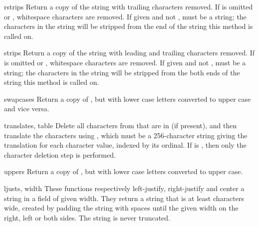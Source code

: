\begin{funcdesc}{rstrip}{s}
Return a copy of the string with trailing characters removed.  If
 is omitted or , whitespace characters are
removed.  If given and not ,  must be a string;
the characters in the string will be stripped from the end of the
string this method is called on.
\end{funcdesc}

\begin{funcdesc}{strip}{s}
Return a copy of the string with leading and trailing characters
removed.  If  is omitted or , whitespace
characters are removed.  If given and not , 
must be a string; the characters in the string will be stripped from
the both ends of the string this method is called on.
\end{funcdesc}

\begin{funcdesc}{swapcase}{s}
  Return a copy of , but with lower case letters
  converted to upper case and vice versa.
\end{funcdesc}

\begin{funcdesc}{translate}{s, table}
  Delete all characters from  that are in  (if 
  present), and then translate the characters using , which 
  must be a 256-character string giving the translation for each
  character value, indexed by its ordinal.  If  is ,
  then only the character deletion step is performed.
\end{funcdesc}

\begin{funcdesc}{upper}{s}
  Return a copy of , but with lower case letters converted to
  upper case.
\end{funcdesc}

\begin{funcdesc}{ljust}{s, width}
  These functions respectively left-justify, right-justify and center
  a string in a field of given width.  They return a string that is at
  least  characters wide, created by padding the string
   with spaces until the given width on the right, left or both
  sides.  The string is never truncated.
\end{funcdesc}

